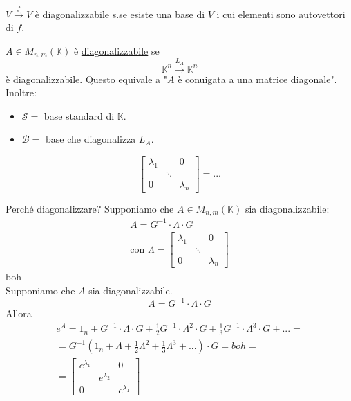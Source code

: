 \begin{osservazione}
    $V \xrightarrow{f} V$ è diagonalizzabile s.se esiste una base di $V$ i cui elementi sono autovettori di $f$.
\end{osservazione}

\begin{notazione}
    $A\in M_{n,m}(\mathbb{K})$ è \underline{diagonalizzabile} se
    \begin{equation}
        \mathbb{K}^n \xrightarrow{L_A} \mathbb{K}^n
    \end{equation}
    è diagonalizzabile. Questo equivale a "$A$ è conuigata a una matrice diagonale". Inoltre:
    \begin{itemize}
        \item $\mathcal{S} =$ base standard di $\mathbb{K}$.
        \item $\mathscr{B} =$ base che diagonalizza $L_A$.
    \end{itemize}
    \begin{equation}
        \begin{bmatrix}
            \lambda_1 && 0 \\
                      & \ddots &\\
            0 && \lambda_n
        \end{bmatrix} = ...
    \end{equation}
\end{notazione}

Perché diagonalizzare? Supponiamo che $A\in M_{n,m}(\mathbb{K})$ sia diagonalizzabile:
\begin{gather}
    A=G^{-1}\cdot \Lambda \cdot G \\
    \text{con }\Lambda = \begin{bmatrix}
            \lambda_1 && 0 \\
            & \ddots &\\
            0 && \lambda_n
    \end{bmatrix}
\end{gather}
boh \\

Supponiamo che $A$ sia diagonalizzabile.
\begin{equation}
    A = G^{-1}\cdot \Lambda \cdot G
\end{equation}
Allora
\begin{gather}
    e^A = 1_n + G^{-1}\cdot \Lambda \cdot G + \frac{1}{2}G^{-1}\cdot \Lambda^2 \cdot G + \frac{1}{3}G^{-1}\cdot \Lambda^3 \cdot G + ... = \\
    = G^{-1}(1_n + \Lambda + \frac{1}{2} \Lambda ^2 + \frac{1}{3} \Lambda^3 + ...)\cdot G = boh = \\
    = \begin{bmatrix}
        e^{\lambda_1} && 0 \\
        & e^{\lambda_2} & \\
        0 && e^{\lambda_1}
    \end{bmatrix}
\end{gather}

